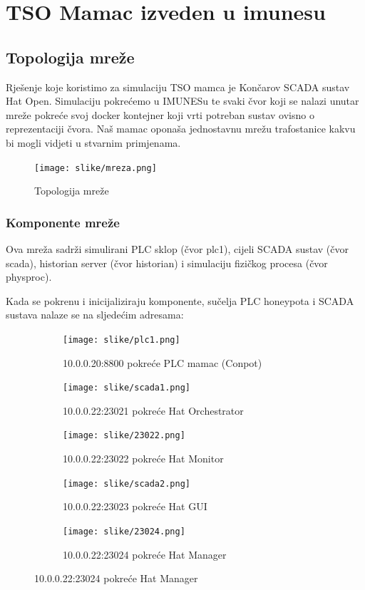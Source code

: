 \documentclass[times, utf8, zavrsni]{fer}
\begin{document}
\section{TSO Mamac izveden u imunesu}
\subsection{Topologija mreže}
Rješenje koje koristimo za simulaciju TSO mamca je Končarov SCADA sustav Hat Open. Simulaciju pokrećemo u IMUNESu te svaki čvor koji se nalazi unutar mreže pokreće svoj docker kontejner koji vrti potreban sustav ovisno o reprezentaciji čvora. Naš mamac oponaša jednostavnu mrežu trafostanice kakvu bi mogli vidjeti u stvarnim primjenama.

\begin{figure}[htb]
\centering
\texttt{[image: slike/mreza.png]}
\caption{Topologija mreže}
\label{fig:mreza}
\end{figure}

\subsubsection{Komponente mreže}
Ova mreža sadrži simulirani PLC sklop (čvor plc1), cijeli SCADA sustav (čvor scada), historian server (čvor historian) i simulaciju fizičkog procesa (čvor physproc). 

Kada se pokrenu i inicijaliziraju komponente, sučelja PLC honeypota i SCADA sustava nalaze se na sljedećim adresama:

\begin{figure}[htb]
\centering
\begin{subfigure}[b]{0.5\textwidth}
    \texttt{[image: slike/plc1.png]}
    \caption{10.0.0.20:8800 pokreće PLC mamac (Conpot)}
    \label{fig:plc1}
  \end{subfigure}
\begin{subfigure}[b]{0.5\textwidth}
    \texttt{[image: slike/scada1.png]}
    \caption{10.0.0.22:23021 pokreće Hat Orchestrator}
    \label{fig:scada1}
  \end{subfigure}
  \begin{subfigure}[b]{0.5\textwidth}
    \texttt{[image: slike/23022.png]}
    \caption{10.0.0.22:23022 pokreće Hat Monitor}
    \label{fig:scada2}
  \end{subfigure}
  \begin{subfigure}[b]{0.5\textwidth}
    \texttt{[image: slike/scada2.png]}
    \caption{10.0.0.22:23023 pokreće Hat GUI}
    \label{fig:scada3}
  \end{subfigure}
  \begin{subfigure}[b]{0.5\textwidth}
    \texttt{[image: slike/23024.png]}
    \caption{10.0.0.22:23024 pokreće Hat Manager}
    \label{fig:scada4}
  \end{subfigure}
\end{figure}
\end{document}
